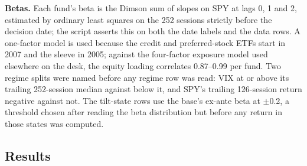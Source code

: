 \documentclass[10pt, a4paper, twocolumn]{article}
\begin{document}
\textbf{Betas.} Each fund's beta is the Dimson \cite{dimson1979} sum of slopes on SPY at lags 0, 1 and 2, estimated by ordinary least squares on the 252 sessions strictly before the decision date; the script asserts this on both the date labels and the data rows. A one-factor model is used because the credit and preferred-stock ETFs start in 2007 and the sleeve in 2005; against the four-factor exposure model used elsewhere on the desk, the equity loading correlates 0.87--0.99 per fund. Two regime splits were named before any regime row was read: VIX at or above its trailing 252-session median against below it, and SPY's trailing 126-session return negative against not. The tilt-state rows use the base's ex-ante beta at $\pm$0.2, a threshold chosen after reading the beta distribution but before any return in those states was computed.

\subsection{Results}
\end{document}
